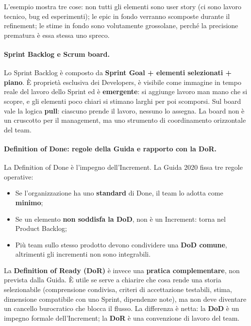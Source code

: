 \documentclass[12pt]{extarticle}
\begin{document}
\noindent L'esempio mostra tre cose: non tutti gli elementi sono user story (ci sono lavoro tecnico, bug ed esperimenti); le epic in fondo verranno scomposte durante il refinement; le stime in fondo sono volutamente grossolane, perché la precisione prematura è essa stessa uno spreco.

\paragraph{Sprint Backlog e Scrum board.}
Lo Sprint Backlog è composto da \textbf{Sprint Goal + elementi selezionati + piano}. È proprietà esclusiva dei Developers, è visibile come immagine in tempo reale del lavoro dello Sprint ed è \textbf{emergente}: si aggiunge lavoro man mano che si scopre, e gli elementi poco chiari si stimano larghi per poi scomporsi. Sul board vale la logica \textbf{pull}: ciascuno prende il lavoro, nessuno lo assegna. La board non è un cruscotto per il management, ma uno strumento di coordinamento orizzontale del team.

\paragraph{Definition of Done: regole della Guida e rapporto con la DoR.}
La Definition of Done è l'impegno dell'Increment. La Guida 2020 fissa tre regole operative:
\begin{itemize}
    \item Se l'organizzazione ha uno \textbf{standard} di Done, il team lo adotta come \textbf{minimo};
    \item Se un elemento \textbf{non soddisfa la DoD}, non è un Increment: torna nel Product Backlog;
    \item Più team sullo stesso prodotto devono condividere una \textbf{DoD comune}, altrimenti gli incrementi non sono integrabili.
\end{itemize}
\noindent La \textbf{Definition of Ready (DoR)} è invece una \textbf{pratica complementare}, non prevista dalla Guida. È utile se serve a chiarire che cosa rende una storia selezionabile (comprensione condivisa, criteri di accettazione testabili, stima, dimensione compatibile con uno Sprint, dipendenze note), ma non deve diventare un cancello burocratico che blocca il flusso. La differenza è netta: la \textbf{DoD} è un impegno formale dell'Increment; la \textbf{DoR} è una convenzione di lavoro del team.
\end{document}

